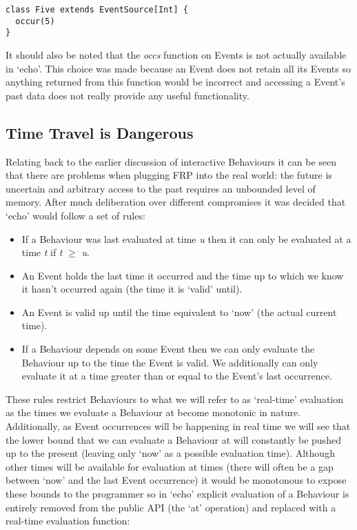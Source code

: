\begin{verbatim}
class Five extends EventSource[Int] {
  occur(5)
}
\end{verbatim}

      It should also be noted that the \emph{occs} function on Events is not actually available in `echo'. This
      choice was made because an Event does not retain all its Events so anything returned from this 
      function would be incorrect and accessing a Event's past data does not really
      provide any useful functionality.

    \subsection{Time Travel is Dangerous}
      Relating back to the earlier discussion of interactive Behaviours it can be seen
      that there are problems when plugging FRP into the real world: the future is uncertain and
      arbitrary access to the past requires an unbounded level of memory. After much deliberation
      over different compromises it was decided that `echo' would follow a set of rules:
      
      \begin{itemize}
        \item If a Behaviour was last evaluated at time \emph{u} then it can only be evaluated at
        a time \emph{t} if \emph{t} $\geq$ \emph{u}.
        \item An Event holds the last time it occurred and the time up to which we know it hasn't occurred
        again (the time it is `valid' until).
        \item An Event is valid up until the time equivalent to `now' (the actual current time).
        \item If a Behaviour depends on some Event then we can only evaluate the Behaviour up to
        the time the Event is valid. We additionally can only evaluate it at a time greater than
        or equal to the Event's last occurrence.
      \end{itemize}
      
      These rules restrict Behaviours to what we will refer to as `real-time' evaluation as the times
      we evaluate a Behaviour at become monotonic in nature. Additionally, as Event occurrences will
      be happening in real time we will see that the lower bound that we can evaluate a Behaviour at will
      constantly be pushed up to the present (leaving only `now' as a possible evaluation time). Although
      other times will be available for evaluation at times (there will often be a gap between `now' and
      the last Event occurrence) it would be monotonous to expose these bounds to the programmer so
      in `echo' explicit evaluation of a Behaviour is entirely removed from the public API (the
      `at' operation) and replaced with a real-time evaluation function:

